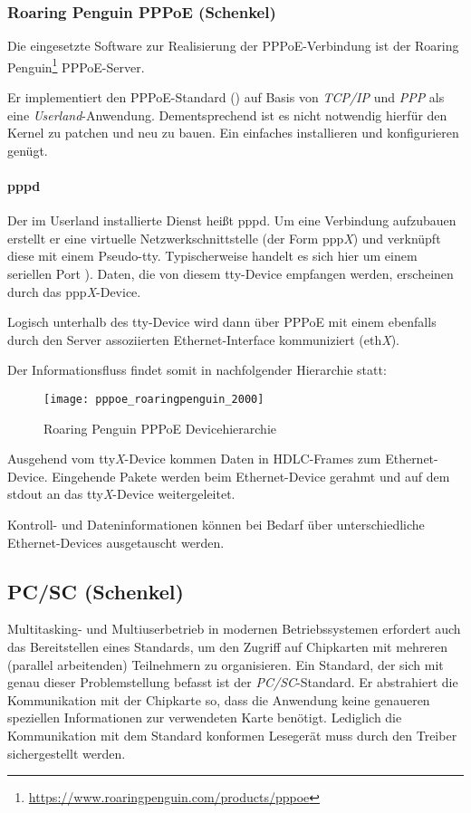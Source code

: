 \subsubsection{Roaring Penguin PPPoE (Schenkel)}
Die eingesetzte Software zur Realisierung der PPPoE-Verbindung ist der
Roaring Penguin\footnote{\url{https://www.roaringpenguin.com/products/pppoe}} PPPoE-Server.

Er implementiert den PPPoE-Standard () auf Basis
von \textit{TCP/IP} und \textit{PPP} als eine \textit{Userland}-Anwendung.
Dementsprechend ist es nicht notwendig hierfür den Kernel zu patchen und neu zu bauen.
Ein einfaches installieren und konfigurieren genügt.

\paragraph{pppd}
Der im Userland installierte Dienst heißt pppd. Um eine Verbindung aufzubauen
erstellt er eine virtuelle Netzwerkschnittstelle (der Form ppp\textit{X}) und verknüpft diese
mit einem Pseudo-\ac{tty}. %
Typischerweise handelt es sich hier um einem seriellen Port \cite{roaringpenguinpres}).
Daten, die von diesem tty-Device empfangen werden, erscheinen durch das ppp\textit{X}-Device.

Logisch unterhalb des tty-Device wird dann über PPPoE mit einem ebenfalls durch den Server
assoziierten Ethernet-Interface kommuniziert (eth\textit{X}).

Der Informationsfluss findet somit in nachfolgender Hierarchie statt:
 \begin{figure}[htp]
  \begin{center}
   \texttt{[image: pppoe\_roaringpenguin\_2000]}
  \end{center}
  \caption[Roaring Penguin PPPoE Devicehierarchie]{Roaring Penguin PPPoE Devicehierarchie \cite{roaringpenguinpres}}
  \label{fig:pppoe_roaringpenguin_devicehierarchy}
 \end{figure}

Ausgehend vom tty\textit{X}-Device kommen Daten in \ac{HDLC}-Frames zum Ethernet-Device.
Eingehende Pakete werden beim Ethernet-Device gerahmt und auf dem stdout an
das tty\textit{X}-Device weitergeleitet.

Kontroll- und Dateninformationen können bei Bedarf über unterschiedliche
Ethernet-Devices ausgetauscht werden.

\subsection{PC/SC (Schenkel)}
Multitasking- und Multiuserbetrieb in modernen Betriebssystemen erfordert
auch das Bereitstellen eines Standards, um den Zugriff auf Chipkarten
mit mehreren (parallel arbeitenden) Teilnehmern zu organisieren. Ein Standard, der sich mit genau
dieser Problemstellung befasst ist der \textit{\ac{PC/SC}}-Standard.
Er abstrahiert die Kommunikation mit der Chipkarte so,
dass die Anwendung keine genaueren speziellen Informationen zur verwendeten
Karte benötigt. Lediglich die Kommunikation mit dem Standard
konformen Lesegerät muss durch den Treiber sichergestellt werden.

